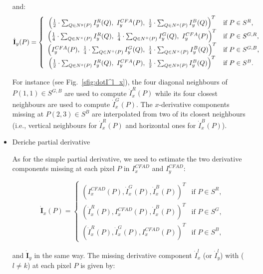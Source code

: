 \documentclass[twoside]{article}
\newcommand\D{I^{CFAD}} %
\begin{document}
\begin{itemize}
		\noindent and:
		\begin{equation}
			\dot{\textbf{I}}_y(P) = \left\lbrace
			\begin{array}{cl}
				\left( \frac{1}{2}\cdot\sum_{Q \in N^{y}(P)} I^R_y(Q),~I^{CFA}_y(P),~\frac{1}{2}\cdot\sum_{Q \in N^{x}(P)} I^B_y(Q) \right)^T & \text{if $P \in S^R$,} \\
				\left( \frac{1}{4}\cdot\sum_{Q \in N^{\times}(P)} I^R_y(Q),~\frac{1}{4}\cdot\sum_{Q \in N^{+}(P)} I^G_y(Q),~I^{CFA}_y(P) \right)^T & \text{if $P \in S^{G,R}$,}\\
				\left( I^{CFA}_y(P),~\frac{1}{4}\cdot\sum_{Q \in N^{+}(P)} I^G_y(Q),~\frac{1}{4}\cdot\sum_{Q \in N^{\times}(P)} I^B_y(Q) \right)^T & \text{if $P \in S^{G,B}$,}\\
				\left( \frac{1}{2}\cdot\sum_{Q \in N^{x}(P)} I^R_y(Q),~I^{CFA}_y(P),~\frac{1}{2}\cdot\sum_{Q \in N^{y}(P)} I^B_y(Q) \right)^T & \text{if $P \in S^B$.}
			\end{array}\right.
			\label{eq:I_p_y_full}
		\end{equation}
		
		\noindent For instance (see Fig.~\ref{sfig:dotI^l_x}), the four diagonal neighbours of $P(1,1) \in S^{G,B}$ are used to compute $\dot{I}^R_x(P)$ while its four closest neighbours are used to compute $\dot{I}^G_x(P)$. The $x$-derivative components missing at $P(2,3) \in S^B$  are interpolated from two of its closest neighbours (i.e., vertical neighbours for $\dot{I}^R_x(P)$ and horizontal ones for $\dot{I}^B_x(P)$).
		

	\item Deriche partial derivative
	
	
		As for the simple partial derivative, we need to estimate the two derivative components missing at each pixel $P$ in $\D_x$ and $\D_y$: 	
		
	
			\begin{equation}
				\dot{\textbf{I}}_x(P) = \left\lbrace
				\begin{array}{cl}
					\left( \D_x(P), \dot{I}^G_x(P), \dot{I}^B_x(P) \right)^T & \text{if $P \in S^{R}$,}\\
					\left( \dot{I}^R_x(P), \D_x(P), \dot{I}^B_x(P) \right)^T & \text{if $P \in S^G$,}\\
					\left( \dot{I}^R_x(P), \dot{I}^G_x(P), \D_x(P) \right)^T & \text{if $P \in S^{B}$,}
				\end{array}\right.
				\label{eq:I^D_p_x}
			\end{equation}
			
			
	
		\noindent and $\dot{\textbf{I}}_y$ in the same way. The missing derivative component $\dot{I}_{x}^l$ (or $\dot{I}_{y}^l$) with ($l \neq k$) at each pixel $P$ is given by:	
	
	
	
\end{itemize}	
	
\end{document}
